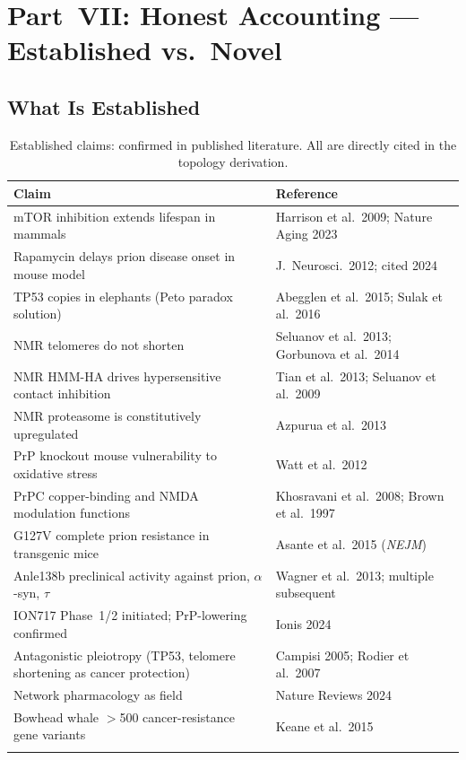 \documentclass[12pt,a4paper]{article}
\begin{document}
\section{Part~VII: Honest Accounting --- Established vs.\ Novel}

\subsection{What Is Established}

\begin{longtable}{p{7cm} p{4.5cm}}
  \toprule
  \textbf{Claim} & \textbf{Reference} \\
  \midrule
  mTOR inhibition extends lifespan in mammals & Harrison et al.\ 2009;
    Nature Aging 2023 \\
  Rapamycin delays prion disease onset in mouse model &
    J.\ Neurosci.\ 2012; cited 2024 \\
  TP53 copies in elephants (Peto paradox solution) &
    Abegglen et al.\ 2015; Sulak et al.\ 2016 \\
  NMR telomeres do not shorten & Seluanov et al.\ 2013;
    Gorbunova et al.\ 2014 \\
  NMR HMM-HA drives hypersensitive contact inhibition &
    Tian et al.\ 2013; Seluanov et al.\ 2009 \\
  NMR proteasome is constitutively upregulated &
    Azpurua et al.\ 2013 \\
  PrP knockout mouse vulnerability to oxidative stress &
    Watt et al.\ 2012 \\
  PrPC copper-binding and NMDA modulation functions &
    Khosravani et al.\ 2008; Brown et al.\ 1997 \\
  G127V complete prion resistance in transgenic mice &
    Asante et al.\ 2015 (\textit{NEJM}) \\
  Anle138b preclinical activity against prion, $\alpha$-syn, $\tau$ &
    Wagner et al.\ 2013; multiple subsequent \\
  ION717 Phase~1/2 initiated; PrP-lowering confirmed &
    Ionis 2024 \\
  Antagonistic pleiotropy (TP53, telomere shortening as
    cancer protection) & Campisi 2005; Rodier et al.\ 2007 \\
  Network pharmacology as field &
    Nature Reviews 2024 \\
  Bowhead whale $>$500 cancer-resistance gene variants &
    Keane et al.\ 2015 \\
  \bottomrule
  \caption{Established claims: confirmed in published literature.
    All are directly cited in the topology derivation.}
\end{longtable}
\end{document}
